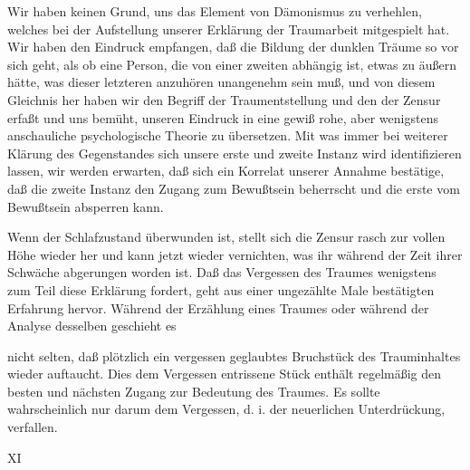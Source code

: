 \documentclass{article}
\begin{document}
            
        \pstart
        Wir haben keinen Grund, uns das Element von Dämonismus zu verhehlen, welches bei
               der Aufstellung unserer Erklärung der Traumarbeit mitgespielt hat. Wir haben den
               Eindruck empfangen, daß die Bildung der dunklen Träume so vor sich geht, als ob eine Person, die von einer zweiten
               abhängig ist, etwas zu äußern hätte, was dieser letzteren anzuhören unangenehm
               sein muß, und von diesem Gleichnis her haben wir den Begriff der Traumentstellung und den der Zensur erfaßt und uns bemüht, unseren Eindruck
               in eine gewiß rohe, aber wenigstens anschauliche psychologische
               Theorie zu übersetzen. Mit was immer bei weiterer Klärung des Gegenstandes sich
               unsere erste und zweite Instanz wird identifizieren lassen, wir werden erwarten,
               daß sich ein Korrelat unserer Annahme bestätige, daß die zweite Instanz den
               Zugang zum Bewußtsein beherrscht und die erste vom Bewußtsein absperren
               kann.
        \pend
    
            
        \pstart
        Wenn der Schlafzustand überwunden ist, stellt sich die Zensur rasch zur vollen
               Höhe wieder her und kann jetzt wieder vernichten, was ihr während der
               Zeit ihrer Schwäche abgerungen worden ist. Daß das Vergessen des Traumes wenigstens zum Teil
               diese Erklärung fordert, geht aus einer ungezählte Male bestätigten Erfahrung
               hervor. Während der Erzählung eines Traumes oder während der Analyse desselben
               geschieht es
            
        \pend
    
         
            
            
            
        \pstart
        nicht selten, daß plötzlich ein vergessen geglaubtes Bruchstück des
               Trauminhaltes wieder auftaucht. Dies dem Vergessen entrissene Stück
               enthält regelmäßig den besten und nächsten Zugang zur Bedeutung des Traumes. Es
               sollte wahrscheinlich nur darum dem Vergessen, d. i. der neuerlichen
               Unterdrückung, verfallen.
            
        \pend
    
         
            
            
            
        \pstart
        XI
        \pend
    
\end{document}

